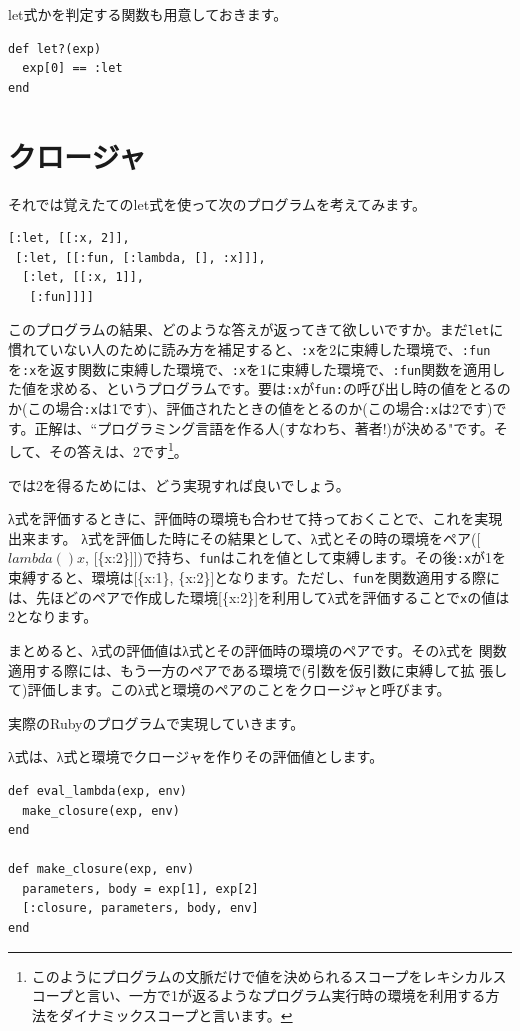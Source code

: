 let式かを判定する関数も用意しておきます。

\begin{lstlisting}
def let?(exp)
  exp[0] == :let
end
\end{lstlisting}

\section{クロージャ}

それでは覚えたてのlet式を使って次のプログラムを考えてみます。

\begin{lstlisting}
[:let, [[:x, 2]],
 [:let, [[:fun, [:lambda, [], :x]]],
  [:let, [[:x, 1]],
   [:fun]]]]
\end{lstlisting}

このプログラムの結果、どのような答えが返ってきて欲しいですか。まだ{\tt let}に慣れていない人のために読み方を補足すると、{\tt :x}を2に束縛した環境で、{\tt :fun}を{\tt :x}を返す関数に束縛した環境で、{\tt :x}を1に束縛した環境で、{\tt :fun}関数を適用した値を求める、というプログラムです。要は{\tt :x}が{\tt fun:}の呼び出し時の値をとるのか(この場合{\tt :x}は1です)、評価されたときの値をとるのか(この場合{\tt :x}は2です)です。正解は、“プログラミング言語を作る人(すなわち、著者!)が決める"です。そして、その答えは、2です\footnote{このようにプログラムの文脈だけで値を決められるスコープをレキシカルスコープと言い、一方で1が返るようなプログラム実行時の環境を利用する方法をダイナミックスコープと言います。}。

では2を得るためには、どう実現すれば良いでしょう。

λ式を評価するときに、評価時の環境も合わせて持っておくことで、これを実現出来ます。
λ式を評価した時にその結果として、λ式とその時の環境をペア([$lambda () x$, [\{x:2\}]])で持ち、{\tt fun}はこれを値として束縛します。その後{\tt :x}が1を束縛すると、環境は[\{x:1\}, \{x:2\}]となります。ただし、{\tt fun}を関数適用する際には、先ほどのペアで作成した環境[\{x:2\}]を利用してλ式を評価することで{\tt x}の値は2となります。

まとめると、λ式の評価値はλ式とその評価時の環境のペアです。そのλ式を
関数適用する際には、もう一方のペアである環境で(引数を仮引数に束縛して拡
張して)評価します。このλ式と環境のペアのことをクロージャと呼びます。

実際のRubyのプログラムで実現していきます。

λ式は、λ式と環境でクロージャを作りその評価値とします。

\begin{lstlisting}
def eval_lambda(exp, env)
  make_closure(exp, env)
end

def make_closure(exp, env)
  parameters, body = exp[1], exp[2]
  [:closure, parameters, body, env]
end
\end{lstlisting}

